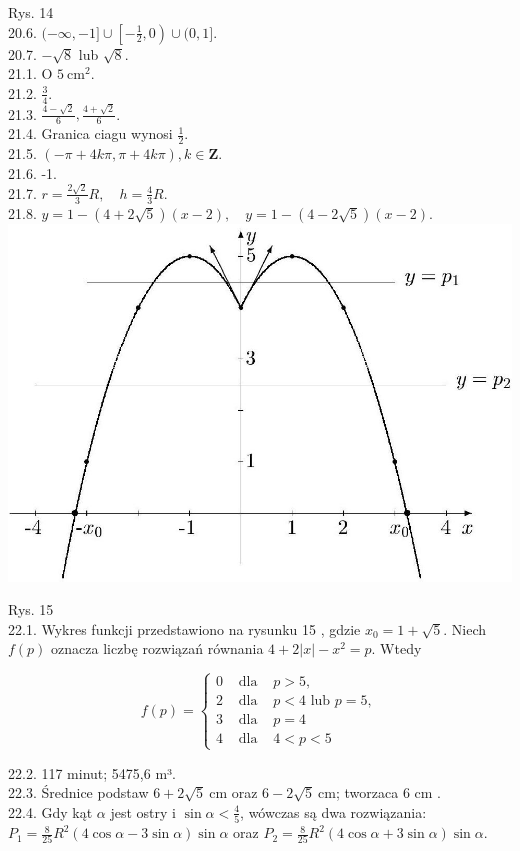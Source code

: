 \documentclass[10pt]{article}
\begin{document}
Rys. 14\\
20.6. $(-\infty,-1] \cup\left[-\frac{1}{2}, 0\right) \cup(0,1]$.\\
20.7. $-\sqrt{8}$ lub $\sqrt{8}$.\\
21.1. O $5 \mathrm{~cm}^{2}$.\\
21.2. $\frac{3}{4}$.\\
21.3. $\frac{4-\sqrt{2}}{6}, \frac{4+\sqrt{2}}{6}$.\\
21.4. Granica ciagu wynosi $\frac{1}{2}$.\\
21.5. $(-\pi+4 k \pi, \pi+4 k \pi), k \in \mathbf{Z}$.\\
21.6. -1.\\
21.7. $r=\frac{2 \sqrt{2}}{3} R, \quad h=\frac{4}{3} R$.\\
21.8. $y=1-(4+2 \sqrt{5})(x-2), \quad y=1-(4-2 \sqrt{5})(x-2)$.\\
\includegraphics[max width=\textwidth, center]{2024_11_16_fe5b564401bf7db98894g-069}

Rys. 15\\
22.1. Wykres funkcji przedstawiono na rysunku 15 , gdzie $x_{0}=1+\sqrt{5}$. Niech $f(p)$ oznacza liczbę rozwiązań równania $4+2|x|-x^{2}=p$. Wtedy

$$
f(p)=\left\{\begin{array}{lll}
0 & \text { dla } & p>5, \\
2 & \text { dla } & p<4 \text { lub } p=5, \\
3 & \text { dla } & p=4 \\
4 & \text { dla } & 4<p<5
\end{array}\right.
$$

22.2. 117 minut; 5475,6 m³.\\
22.3. Średnice podstaw $6+2 \sqrt{5} \mathrm{~cm}$ oraz $6-2 \sqrt{5} \mathrm{~cm}$; tworzaca 6 cm .\\
22.4. Gdy kąt $\alpha$ jest ostry i $\sin \alpha<\frac{4}{5}$, wówczas są dwa rozwiązania: $P_{1}=\frac{8}{25} R^{2}(4 \cos \alpha-3 \sin \alpha) \sin \alpha$ oraz $P_{2}=\frac{8}{25} R^{2}(4 \cos \alpha+3 \sin \alpha) \sin \alpha$.
\end{document}
